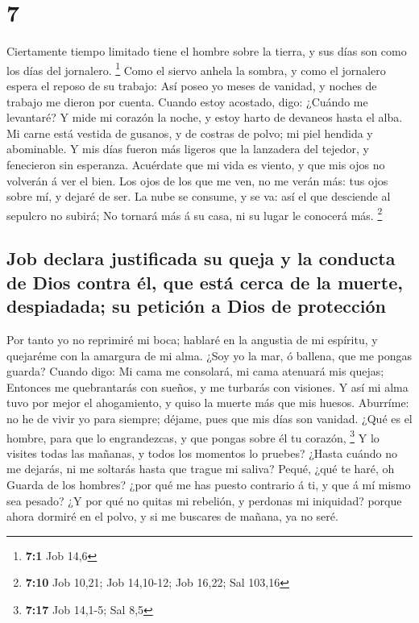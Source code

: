 \hypertarget{section-6}{%
\section{7}\label{section-6}}

 Ciertamente tiempo limitado tiene el hombre sobre la
tierra, y sus días son como los días del jornalero. \footnote{\textbf{7:1}
  Job 14,6}  Como el siervo anhela la sombra, y como el
jornalero espera el reposo de su trabajo:  Así poseo yo
meses de vanidad, y noches de trabajo me dieron por cuenta.
 Cuando estoy acostado, digo: ¿Cuándo me levantaré? Y mide
mi corazón la noche, y estoy harto de devaneos hasta el alba.
 Mi carne está vestida de gusanos, y de costras de polvo;
mi piel hendida y abominable.  Y mis días fueron más
ligeros que la lanzadera del tejedor, y fenecieron sin esperanza.
 Acuérdate que mi vida es viento, y que mis ojos no
volverán á ver el bien.  Los ojos de los que me ven, no me
verán más: tus ojos sobre mí, y dejaré de ser.  La nube se
consume, y se va: así el que desciende al sepulcro no subirá;
 No tornará más á su casa, ni su lugar le conocerá más.
\footnote{\textbf{7:10} Job 10,21; Job 14,10-12; Job 16,22; Sal 103,16}

\hypertarget{job-declara-justificada-su-queja-y-la-conducta-de-dios-contra-uxe9l-que-estuxe1-cerca-de-la-muerte-despiadada-su-peticiuxf3n-a-dios-de-protecciuxf3n}{%
\subsection{Job declara justificada su queja y la conducta de Dios
contra él, que está cerca de la muerte, despiadada; su petición a Dios
de
protección}\label{job-declara-justificada-su-queja-y-la-conducta-de-dios-contra-uxe9l-que-estuxe1-cerca-de-la-muerte-despiadada-su-peticiuxf3n-a-dios-de-protecciuxf3n}}

 Por tanto yo no reprimiré mi boca; hablaré en la
angustia de mi espíritu, y quejaréme con la amargura de mi alma.
 ¿Soy yo la mar, ó ballena, que me pongas guarda?
 Cuando digo: Mi cama me consolará, mi cama atenuará mis
quejas;  Entonces me quebrantarás con sueños, y me
turbarás con visiones.  Y así mi alma tuvo por mejor el
ahogamiento, y quiso la muerte más que mis huesos. 
Aburríme: no he de vivir yo para siempre; déjame, pues que mis días son
vanidad.  ¿Qué es el hombre, para que lo engrandezcas, y
que pongas sobre él tu corazón, \footnote{\textbf{7:17} Job 14,1-5; Sal
  8,5}  Y lo visites todas las mañanas, y todos los
momentos lo pruebes?  ¿Hasta cuándo no me dejarás, ni me
soltarás hasta que trague mi saliva?  Pequé, ¿qué te
haré, oh Guarda de los hombres? ¿por qué me has puesto contrario á ti, y
que á mí mismo sea pesado?  ¿Y por qué no quitas mi
rebelión, y perdonas mi iniquidad? porque ahora dormiré en el polvo, y
si me buscares de mañana, ya no seré.

